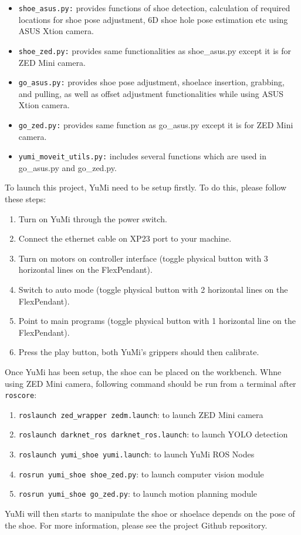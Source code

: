 \begin{itemize}
    \item \texttt{shoe\_asus.py:} provides functions of shoe detection, calculation of required locations for shoe pose adjustment, 6D shoe hole pose estimation etc using ASUS Xtion camera.
    \item \texttt{shoe\_zed.py:} provides same functionalities as shoe\_asus.py except it is for ZED Mini camera.
    
    \item \texttt{go\_asus.py:} provides shoe pose adjustment, shoelace insertion, grabbing, and pulling, as well as offset adjustment functionalities while using ASUS Xtion camera.
    \item \texttt{go\_zed.py:} provides same function as go\_asus.py except it is for ZED Mini camera.
    \item \texttt{yumi\_moveit\_utils.py:} includes several functions which are used in go\_asus.py and go\_zed.py.
\end{itemize}

To launch this project, YuMi need to be setup firstly. To do this, please follow these steps:
\begin{enumerate}
\item Turn on YuMi through the power switch.
\item Connect the ethernet cable on XP23 port to your machine.
\item Turn on motors on controller interface (toggle physical button with 3 horizontal lines on the FlexPendant).
\item Switch to auto mode (toggle physical button with 2 horizontal lines on the FlexPendant).
\item Point to main programs (toggle physical button with 1 horizontal line on the FlexPendant).
\item Press the play button, both YuMi's grippers should then calibrate.
\end{enumerate}

Once YuMi has been setup, the shoe can be placed on the workbench. Whne using ZED Mini camera, following command should be run from a terminal after \texttt{roscore}:
\begin{enumerate}
\item \texttt{roslaunch zed\_wrapper zedm.launch}: to launch ZED Mini camera
\item \texttt{roslaunch darknet\_ros darknet\_ros.launch}: to launch YOLO detection
\item \texttt{roslaunch yumi\_shoe yumi.launch}: to launch YuMi ROS Nodes
\item \texttt{rosrun yumi\_shoe shoe\_zed.py}: to launch computer vision module
\item \texttt{rosrun yumi\_shoe go\_zed.py}: to launch motion planning module
\end{enumerate}

YuMi will then starts to manipulate the shoe or shoelace depends on the pose of the shoe. For more information, please see the project Github repository.